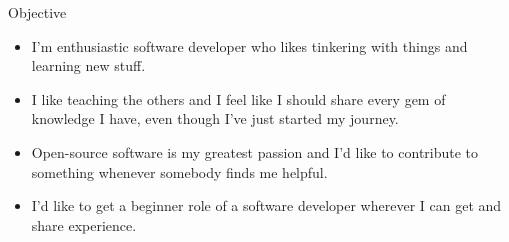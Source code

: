 \documentclass[12pt]{article}
\begin{document}
    \begin{adjustwidth}{0.5cm}{0.5cm}
    {
        \begin{tcolorbox}[colback=Grey,colframe=Yellow, sharp corners, leftrule=1mm, toprule=0mm, bottomrule=0mm, rightrule=0mm]
            {\color{White}\Huge Objective}
            \begin{tcolorbox}[colback=LightGrey,colframe=DarkBlue,sharp corners, leftrule=1mm, toprule=0mm, bottomrule=0mm, rightrule=0mm]
                {\large\color{White}
                \begin{itemize}
                    \item I'm enthusiastic software developer who likes tinkering with things and learning new stuff.
                    \item I like teaching the others and I feel like I should share every gem of knowledge I have, even though I've just started my journey.
                    \item Open-source software is my greatest passion and I'd like to contribute to something whenever somebody finds me helpful.
                    \item {\color{DarkCyan} I'd like to get a beginner role of a software developer wherever I can get and share experience.}
                \end{itemize}
                }
            \end{tcolorbox}
        \end{tcolorbox}

}
\end{adjustwidth}
\end{document}
